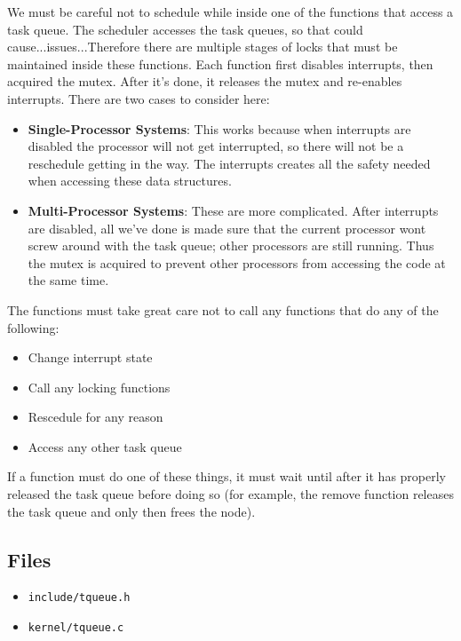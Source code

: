 We must be careful not to schedule while inside one of the functions that
access a task queue. The scheduler accesses the task queues, so that could
cause...issues...Therefore there are multiple stages of locks that must be maintained
inside these functions. Each function first disables interrupts, then acquired
the mutex. After it's done, it releases the mutex and re-enables interrupts.
There are two cases to consider here:
\begin{itemize}

\item \textbf{Single-Processor Systems}:
This works because when interrupts are disabled the processor will not
get interrupted, so there will not be a reschedule getting in the way. The interrupts
creates all the safety needed when accessing these data structures.

\item \textbf{Multi-Processor Systems}:
These are more complicated. After interrupts are disabled, all we've done
is made sure that the current processor wont screw around with the task queue; other
processors are still running. Thus the mutex is acquired to prevent other processors
from accessing the code at the same time.
\end{itemize}


The functions must take great care not to call any functions that do any of the following:
\begin{itemize}
\item Change interrupt state
\item Call any locking functions
\item Rescedule for any reason
\item Access any other task queue
\end{itemize}
If a function must do one of these things, it must wait until after it
has properly released the task queue before doing so (for example, the remove function
releases the task queue and only then frees the node).

\subsection{Files}
\begin{itemize}

\item \texttt{include/tqueue.h}
\item \texttt{kernel/tqueue.c}

\end{itemize}
